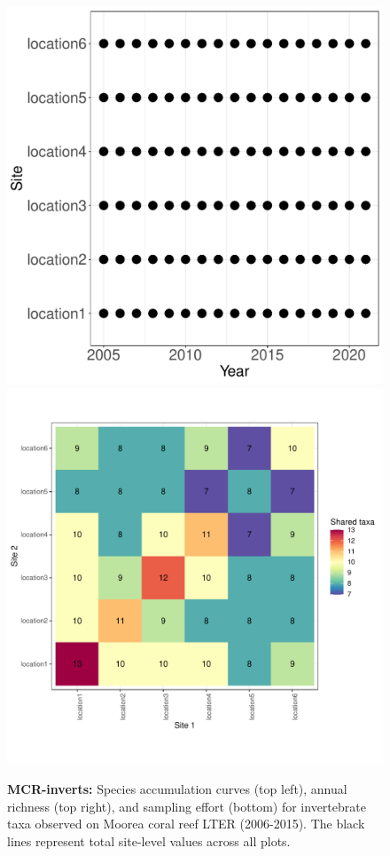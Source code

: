 \documentclass[11pt, oneside]{article}
\begin{document}
\begin{figure}[h!]
\includegraphics[scale = 0.4]{mcr-inverts-castorani_spatiotemporal_sampling_effort.pdf}
\includegraphics[scale = 0.4]{mcr-inverts-castorani_spp_shared.pdf}
\caption{{\bf MCR-inverts:} Species accumulation curves (top left),  annual richness (top right), and sampling effort (bottom)  for invertebrate taxa observed on Moorea coral reef LTER (2006-2015). The black lines represent total site-level values across all plots.}
\label{mcr-inverts}
\end{figure}
\end{document}
